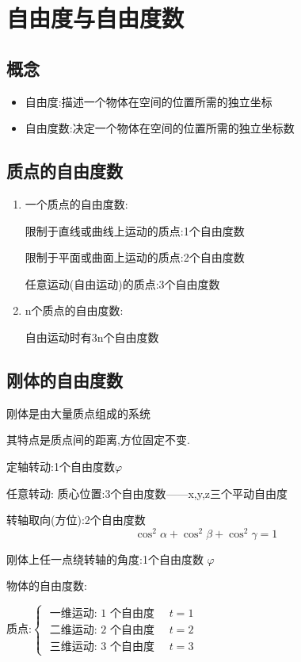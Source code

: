 \documentclass{article}
\begin{document}
\section{自由度与自由度数}

\subsection{概念}

\begin{itemize}
    \item 自由度:描述一个物体在空间的位置所需的独立坐标
    \item 自由度数:决定一个物体在空间的位置所需的独立坐标数
\end{itemize}

\subsection{质点的自由度数}

\begin{enumerate}
    \item 一个质点的自由度数:                  

限制于直线或曲线上运动的质点:1个自由度数

限制于平面或曲面上运动的质点:2个自由度数

任意运动(自由运动)的质点:3个自由度数

\item n个质点的自由度数:

自由运动时有3n个自由度数

\end{enumerate}




\subsection{刚体的自由度数}

刚体是由大量质点组成的系统　

其特点是质点间的距离,方位固定不变.

定轴转动:1个自由度数$\varphi $

任意转动: 质心位置:3个自由度数——x,y,z三个平动自由度

 转轴取向(方位):2个自由度数
$$\cos^2 \alpha + \cos^2 \beta + \cos^2 \gamma = 1$$

 刚体上任一点绕转轴的角度:1个自由度数 $\varphi$

 物体的自由度数:

质点:$\left\{\begin{array}{l}\text { 一维运动: } 1 \text { 个自由度 } \quad t=1 \\ \text { 二维运动: } 2 \text { 个自由度 } \quad t=2 \\ \text { 三维运动: } 3 \text { 个自由度 } \quad t=3\end{array}\right.$
\end{document}
